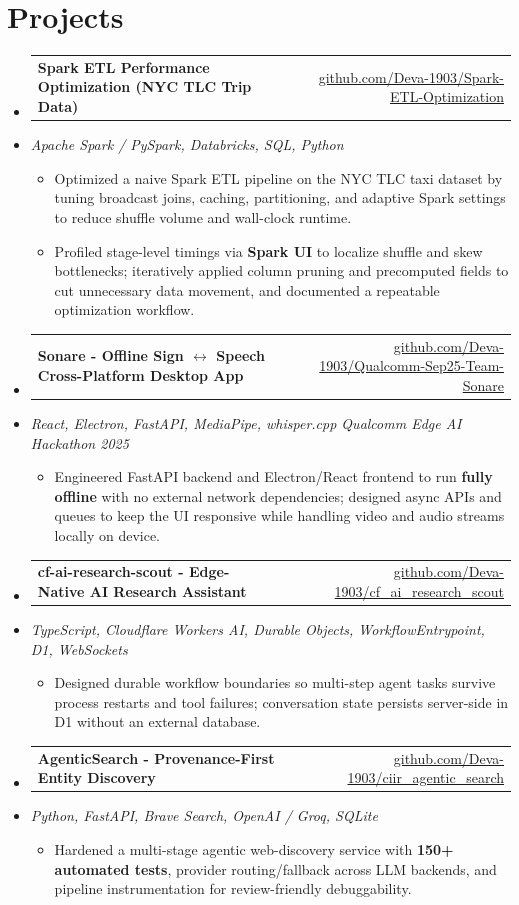 \documentclass[letterpaper,10pt]{article}
\makeatletter
\newcommand{\resumeItem}[1]{
  \item\small{#1\vspace{-1pt}}
}
\newcommand{\resumeProjectHeading}[2]{
    \item
    \begin{tabular*}{0.985\textwidth}[t]{l@{\extracolsep{\fill}}r}
      \small\textbf{#1} & \small #2 \\
    \end{tabular*}\vspace{-5pt}
}
\newcommand{\resumeProjectSubheading}[1]{
  \vspace{-2pt}\item[] {\small\textcolor{ResumeSlate}{\emph{#1}}}\vspace{-3pt}
}
\newcommand{\resumeSubHeadingListStart}{\begin{itemize}[leftmargin=0.0in, label={}, itemsep=2pt, topsep=2pt]}
\newcommand{\resumeSubHeadingListEnd}{\end{itemize}}
\newcommand{\resumeItemListStart}{\begin{itemize}[leftmargin=0.18in, itemsep=2pt, topsep=1pt]}
\newcommand{\resumeItemListEnd}{\end{itemize}\vspace{-4pt}}
\makeatother
\begin{document}
\section{Projects}
\resumeSubHeadingListStart
  \resumeProjectHeading
    {Spark ETL Performance Optimization (NYC TLC Trip Data)}
    {\href{https://github.com/Deva-1903/Spark-ETL-Optimization}{github.com/Deva-1903/Spark-ETL-Optimization}}
  \resumeProjectSubheading{Apache Spark / PySpark, Databricks, SQL, Python}
    \resumeItemListStart
      \resumeItem{Optimized a naive Spark ETL pipeline on the NYC TLC taxi dataset by tuning broadcast joins, caching, partitioning, and adaptive Spark settings to reduce shuffle volume and wall-clock runtime.}
      \resumeItem{Profiled stage-level timings via \textbf{Spark UI} to localize shuffle and skew bottlenecks; iteratively applied column pruning and precomputed fields to cut unnecessary data movement, and documented a repeatable optimization workflow.}
    \resumeItemListEnd
  \resumeProjectHeading
    {Sonare - Offline Sign \(\leftrightarrow\) Speech Cross-Platform Desktop App}
    {\href{https://github.com/Deva-1903/Qualcomm-Sep25-Team-Sonare}{github.com/Deva-1903/Qualcomm-Sep25-Team-Sonare}}
  \resumeProjectSubheading{React, Electron, FastAPI, MediaPipe, whisper.cpp \enspace\textbar\enspace Qualcomm Edge AI Hackathon 2025}
    \resumeItemListStart
      \resumeItem{Engineered FastAPI backend and Electron/React frontend to run \textbf{fully offline} with no external network dependencies; designed async APIs and queues to keep the UI responsive while handling video and audio streams locally on device.}
    \resumeItemListEnd
  \resumeProjectHeading
    {cf-ai-research-scout - Edge-Native AI Research Assistant}
    {\href{https://github.com/Deva-1903/cf_ai_research_scout}{github.com/Deva-1903/cf\_ai\_research\_scout}}
  \resumeProjectSubheading{TypeScript, Cloudflare Workers AI, Durable Objects, WorkflowEntrypoint, D1, WebSockets}
    \resumeItemListStart
      \resumeItem{Designed durable workflow boundaries so multi-step agent tasks survive process restarts and tool failures; conversation state persists server-side in D1 without an external database.}
    \resumeItemListEnd
  \resumeProjectHeading
    {AgenticSearch - Provenance-First Entity Discovery}
    {\href{https://github.com/Deva-1903/ciir_agentic_search}{github.com/Deva-1903/ciir\_agentic\_search}}
  \resumeProjectSubheading{Python, FastAPI, Brave Search, OpenAI / Groq, SQLite}
    \resumeItemListStart
      \resumeItem{Hardened a multi-stage agentic web-discovery service with \textbf{150+ automated tests}, provider routing/fallback across LLM backends, and pipeline instrumentation for review-friendly debuggability.}
    \resumeItemListEnd
\resumeSubHeadingListEnd
\vspace{-4pt}
\end{document}
